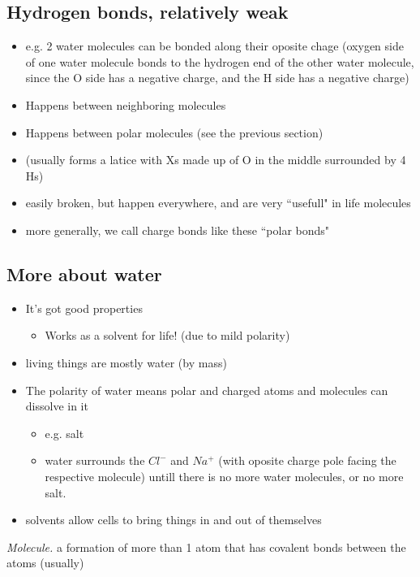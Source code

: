 \documentclass{article}
\theoremstyle{definition}
\begin{document}
\subsection{Hydrogen bonds, relatively weak}
\begin{itemize}
	\item e.g. 2 water molecules can be bonded along their oposite chage (oxygen side of one water molecule bonds to the hydrogen end of the other water molecule, since the O side has a negative charge, and the H side has a negative charge)
	\item Happens between neighboring molecules
	\item Happens between polar molecules (see the previous section)
	\item (usually forms a latice with Xs made up of O in the middle surrounded by 4 Hs)
	\item easily broken, but happen everywhere, and are very ``usefull" in life molecules
	\item more generally, we call charge bonds like these ``polar bonds"
\end{itemize}

\subsection{More about water}
\begin{itemize}
	\item It's got good properties
		\begin{itemize}
			\item Works as a solvent for life! (due to mild polarity)
		\end{itemize}
	\item living things are mostly water (by mass)
	\item The polarity of water means polar and charged atoms and molecules can dissolve in it
		\begin{itemize}
			\item e.g. salt
			\item water surrounds the $Cl^-$ and $Na^+$ (with oposite charge pole facing the respective molecule) untill there is no more water molecules, or no more salt.
		\end{itemize}
	\item solvents allow cells to bring things in and out of themselves
\end{itemize}

 \textit{Molecule.} a formation of more than 1 atom that has covalent bonds between the atoms (usually)
\end{document}
